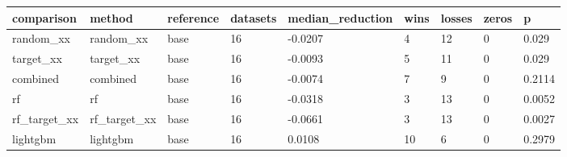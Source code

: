 \begin{tabular}{lllllllll}
\toprule
comparison & method & reference & datasets & median\_reduction & wins & losses & zeros & p \\
\midrule
random\_xx & random\_xx & base & 16 & -0.0207 & 4 & 12 & 0 & 0.029 \\
target\_xx & target\_xx & base & 16 & -0.0093 & 5 & 11 & 0 & 0.029 \\
combined & combined & base & 16 & -0.0074 & 7 & 9 & 0 & 0.2114 \\
rf & rf & base & 16 & -0.0318 & 3 & 13 & 0 & 0.0052 \\
rf\_target\_xx & rf\_target\_xx & base & 16 & -0.0661 & 3 & 13 & 0 & 0.0027 \\
lightgbm & lightgbm & base & 16 & 0.0108 & 10 & 6 & 0 & 0.2979 \\
\bottomrule
\end{tabular}
